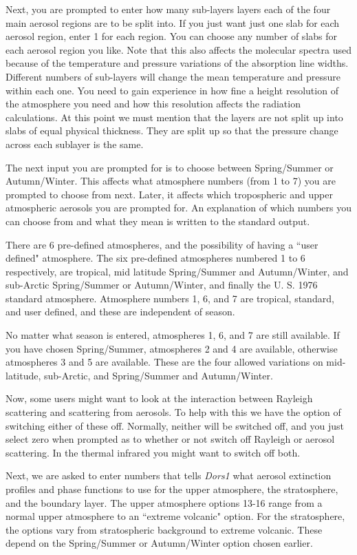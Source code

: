 \documentclass[12pt]{article}
\begin{document}
Next, you are prompted to enter how many sub-layers layers each of
the four main aerosol regions are to be split into. If you just want just one slab for
each aerosol region, enter 1 for each region. You can choose any number of slabs for
each aerosol region you like. Note that this also affects the molecular spectra used
because of the temperature and pressure variations of the absorption line
 widths. Different numbers of sub-layers will change the mean temperature and pressure within each one.
 You need to
gain experience in how fine a height resolution of the atmosphere you need and how this resolution
 affects the radiation calculations. At this point we must mention
that the layers are not split up into slabs of equal physical thickness. They are split up
so that the pressure change across each sublayer is the same.

The next input you are prompted for is to choose between Spring/Summer or Autumn/Winter. 
This affects what atmosphere numbers
(from 1 to 7) you are prompted to choose from next. Later, it affects which tropospheric and
upper atmospheric aerosols you are prompted for. An explanation of which numbers you can choose
from and what they mean is written to the standard output.


There are  6 pre-defined atmospheres,  and the possibility of having a ``user defined" atmosphere.
The six pre-defined atmospheres numbered 1 to 6 respectively, are tropical, mid latitude Spring/Summer and Autumn/Winter, and 
sub-Arctic Spring/Summer or Autumn/Winter, and finally
the U. S. 1976 standard atmosphere. 
Atmosphere numbers 1, 6, and 7 are tropical, standard, and user defined, and these are independent of season.

 No matter what season is entered, atmospheres 1, 6, and 7 are still available. 
 If you have chosen
Spring/Summer, atmospheres 2 and 4 are available, otherwise atmospheres 3 and 5 are available.
These are the four allowed variations on mid-latitude, sub-Arctic, and Spring/Summer and Autumn/Winter.

Now, some users might want to look at the interaction 
 between Rayleigh scattering and scattering from aerosols. To help with this we have the option
of switching either of these off. Normally, neither will be switched off, and you just select
zero when prompted as to  whether or not switch off Rayleigh or aerosol scattering. In the thermal
infrared you might want to switch off both.

Next, we are asked to enter numbers that tells {\it Dors1} what aerosol extinction profiles
and phase functions to use for the upper atmosphere, the stratosphere, and the boundary layer.
The upper atmosphere options 13-16 range from a normal upper atmosphere to an ``extreme volcanic"
option. For the stratosphere, the options vary from stratospheric background to extreme volcanic.
These depend on the Spring/Summer or Autumn/Winter option chosen earlier.
\end{document}
